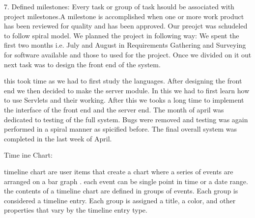 7. Defined milestones: 
Every task or group of task hsould be associated with project milestones.A milestone is accomplished when one or more work product has been reviewed for quality and has been approved.
Our preojct was schudeled to follow spiral model. We planned the project in following way: 
We spent the first two months i.e. July and August in Requirements Gathering and Surveying for software available and those to used for the project. Once we divided on it out next task was to design the front end of the system.

this took time as we had to first study the languages. After designing the front end we then decided to make the server module. In this we had to first learn how to use Servlets and their working. After this we tooks a long time to implement the interface of the front end and the server end. The month of april was dedicated to testing of the full 
system. Bugs were removed and testing was again performed in a spiral manner as spicified before. The final overall system was completed in the last week of April. 

Time ine Chart: 

timeline chart are user items that create a chart where a series of events are arranged on a bar graph . each event can be single point in time or a date range. the contents of a 
timeline chart are defined in groups of events. Each group is considered a timeline entry. Each group is assigned a title, a color, and other properties that vary by the timeline entry type. 

 




